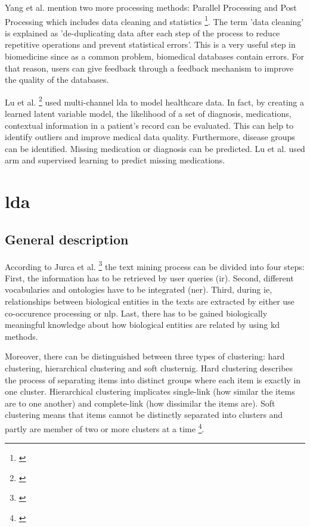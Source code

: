 {Yang et al. mention two more processing methods: Parallel Processing and Post Processing which includes data cleaning and statistics \footnote{\autocite{yang_2018}}. The term 'data cleaning' is explained as 'de-duplicating data after each step of the process to reduce repetitive operations and prevent statistical errors'. This is a very useful step in biomedicine since as a common problem, biomedical databases contain errors. For that reason, users can give feedback through a feedback mechanism to improve the quality of the databases.

Lu et al. \footnote{\autocite{lu_2016}} used multi-channel \gls{lda} to model healthcare data. In fact, by creating a learned latent variable model, the likelihood of a set of diagnosis, medications, contextual information in a patient's record can be evaluated. This can help to identify outliers and improve medical data quality. Furthermore, disease groups can be identified. Missing medication or diagnosis can be predicted. Lu et al. used \gls{arm} and supervised learning to predict missing medications. 

\chapter{\gls{lda}}\label{lda}
\section{General description}\label{lda_description}
According to Jurca et al. \footnote{\autocite{jurca_2016}} the text mining process can be divided into four steps: First, the information has to be retrieved by user queries (\gls{ir}). Second, different vocabularies and ontologies have to be integrated (\gls{ner}). Third, during \gls{ie}, relationships between biological entities in the texts are extracted by either use co-occurence processing or \gls{nlp}. Last, there has to be gained biologically meaningful knowledge about how biological entities are related by using \gls{kd} methods.

Moreover, there can be distinguished between three types of clustering: hard clustering, hierarchical clustering and soft clusternig. Hard clustering describes the process of separating items into distinct groups where each item is exactly in one cluster. Hierarchical clustering implicates single-link (how similar the items are to one another) and complete-link (how dissimilar the items are). Soft clustering means that items cannot be distinctly separated into clusters and partly are member of two or more clusters at a time \footnote{\autocite{jurca_2016}}.  

}

